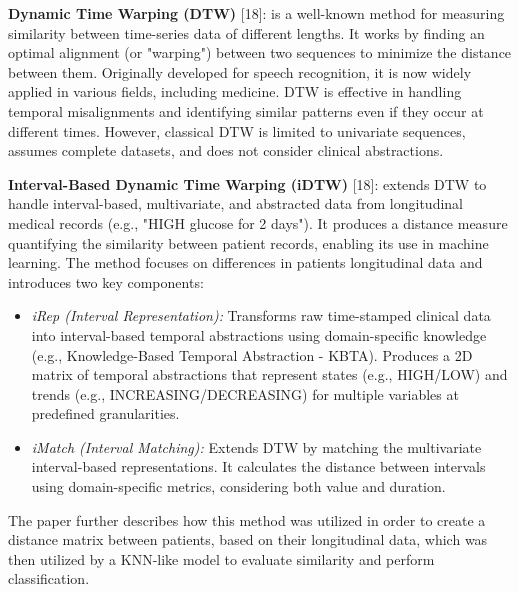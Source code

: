 \documentclass[
]{article}
\begin{document}
\textbf{Dynamic Time Warping (DTW)} {[}18{]}: is a well-known method for
measuring similarity between time-series data of different lengths. It
works by finding an optimal alignment (or "warping") between two
sequences to minimize the distance between them. Originally developed
for speech recognition, it is now widely applied in various fields,
including medicine. DTW is effective in handling temporal misalignments
and identifying similar patterns even if they occur at different times.
However, classical DTW is limited to univariate sequences, assumes
complete datasets, and does not consider clinical abstractions.

\textbf{Interval-Based Dynamic Time Warping (iDTW)} {[}18{]}: extends
DTW to handle interval-based, multivariate, and abstracted data from
longitudinal medical records (e.g., "HIGH glucose for 2 days"). It
produces a distance measure quantifying the similarity between patient
records, enabling its use in machine learning. The method focuses on
differences in patients\textquotesingle{} longitudinal data and
introduces two key components:

\begin{itemize}
\item
  \emph{iRep (Interval Representation):} Transforms raw time-stamped
  clinical data into interval-based temporal abstractions using
  domain-specific knowledge (e.g., Knowledge-Based Temporal Abstraction
  - KBTA). Produces a 2D matrix of temporal abstractions that represent
  states (e.g., HIGH/LOW) and trends (e.g., INCREASING/DECREASING) for
  multiple variables at predefined granularities.
\item
  \emph{iMatch (Interval Matching):} Extends DTW by matching the
  multivariate interval-based representations. It calculates the
  distance between intervals using domain-specific metrics, considering
  both value and duration.
\end{itemize}

The paper further describes how this method was utilized in order to
create a distance matrix between patients, based on their longitudinal
data, which was then utilized by a KNN-like model to evaluate similarity
and perform classification.
\end{document}
